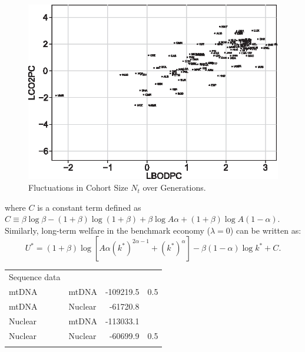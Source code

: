 \documentclass[nogrid]{MBE}%
\begin{document}
\begin{figure}[t]
\begin{center}
\includegraphics[height=0.21\textheight]{flrf1.eps}
\end{center}
\caption{Fluctuations in Cohort Size $N_{t}$ over Generations.}%
\label{fig:popdynamics}%
\end{figure}


where $C$ is a constant term defined as $C\equiv\beta\log\beta-(1+\beta
)\log(1+\beta)+\beta\log A\alpha+(1+\beta)\log A\left(  1-\alpha\right)  $.
Similarly, long-term welfare in the benchmark economy ($\lambda=0$) can be
written as:
\begin{equation}
U^{\ast}=\left(  1+\beta\right)  \log[A\alpha\left(  k^{\ast}\right)
^{2\alpha-1}+\left(  k^{\ast}\right)  ^{\alpha}]-\beta\left(  1-\alpha\right)
\log k^{\ast}+C. \label{eq:U_benchmark}%
\end{equation}

\begin{table}[!t]%
{\begin{tabular*}{\columnwidth}{@{\extracolsep{\fill}}lld{6,0}d{6,0}@{}}\toprule Sequence data &
 &  &  \\\colrule mtDNA& mtDNA& -109219.5& 0.5 \\
[0.1pt]
mtDNA& Nuclear& -61720.8&  \\
Nuclear& mtDNA& -113033.1&  \\
Nuclear& Nuclear& -60699.9& 0.5 \\\botrule
\end{tabular*}}
{}
\end{table}
\end{document}
